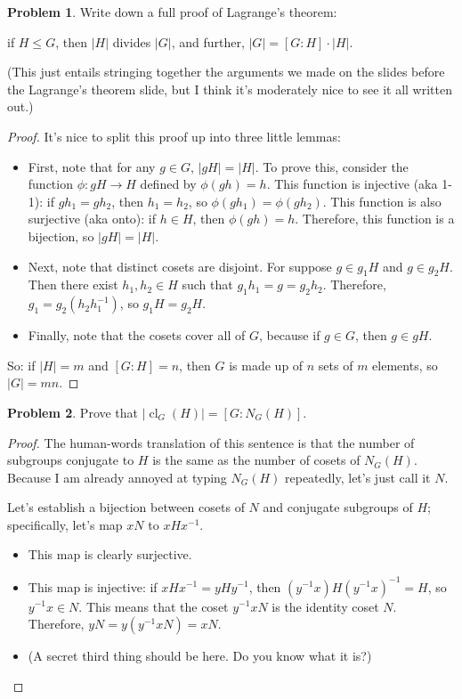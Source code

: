 \documentclass[12pt]{article}
\theoremstyle{definition} %
\newtheorem{problem}{Problem}
\newcommand\inv{^{-1}} %
\begin{document}
\pagebreak

\begin{problem}
    Write down a full proof of Lagrange's theorem: 
    
    \begin{center}
        if $H\leq G$, then $|H|$ divides $|G|$, and further, $|G| = [G:H]\cdot |H|$.
    \end{center}
    
    (This just entails stringing together the arguments we made on the slides before the Lagrange's theorem slide, but I think it's moderately nice to see it all written out.)

    \begin{proof}
        It's nice to split this proof up into three little lemmas:
        \begin{itemize}
            \item First, note that for any $g\in G$, $|gH| = |H|$. To prove this, consider the function $\phi:gH \to H$ defined by $\phi(gh) = h$. This function is injective (aka 1-1): if $gh_1 = gh_2$, then $h_1 = h_2$, so $\phi(gh_1) = \phi(gh_2)$. This function is also surjective (aka onto): if $h\in H$, then $\phi(gh) = h$. Therefore, this function is a bijection, so $|gH| = |H|$.
            \item Next, note that distinct cosets are disjoint. For suppose $g\in g_1H$ and $g\in g_2H$. Then there exist $h_1, h_2\in H$ such that $g_1h_1 = g = g_2h_2$. Therefore, $g_1 = g_2(h_2 h_1\inv)$, so $g_1H = g_2H$.
            \item Finally, note that the cosets cover all of $G$, because if $g\in G$, then $g\in gH$.
        \end{itemize}
        So: if $|H| = m$ and $[G:H]=n$, then $G$ is made up of $n$ sets of $m$ elements, so $|G| = mn$.
    \end{proof}
\end{problem}
\begin{problem}
    Prove that $|\operatorname{cl}_G(H)| = [G:N_G(H)]$.
    \begin{proof}
        The human-words translation of this sentence is that the number of subgroups conjugate to $H$ is the same as the number of cosets of $N_G(H)$. Because I am already annoyed at typing $N_G(H)$ repeatedly, let's just call it $N$. 
        
        Let's establish a bijection between cosets of $N$ and conjugate subgroups of $H$; specifically, let's map $xN$ to $xHx\inv$. 
        \begin{itemize}
            \item This map is clearly surjective.
            \item This map is injective: if $xHx\inv = yHy\inv$, then $(y\inv x) H (y\inv x)\inv = H$, so $y\inv x \in N$. This means that the coset $y\inv x N$ is the identity coset $N$. Therefore, $yN = y\left(y\inv xN\right) = xN$.
            \item (A secret third thing should be here. Do you know what it is?)
        \end{itemize}
    \end{proof}
\end{problem}
\end{document}
